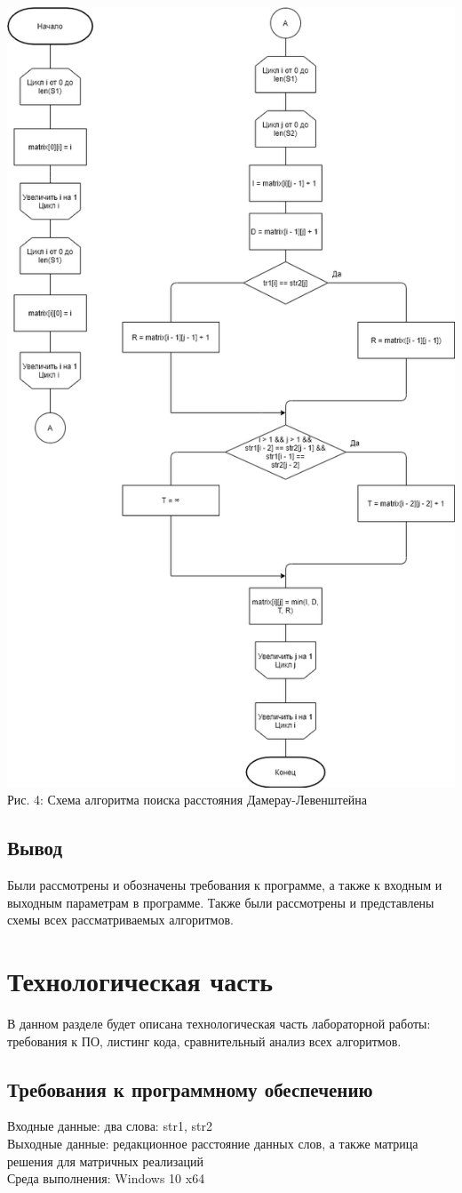 \documentclass[12pt,a4paper]{article}
\begin{document}
\begin{center}
	\includegraphics[width=.67\linewidth]{dam_lev}\\
	Рис. 4: Схема алгоритма поиска расстояния Дамерау-Левенштейна
\end{center}
\subsection{Вывод}
\qquad Были рассмотрены и обозначены требования к программе, а также к входным и выходным параметрам в программе. Также были рассмотрены и представлены схемы всех рассматриваемых алгоритмов.
\clearpage

\section{Технологическая часть}
В данном разделе будет описана технологическая часть лабораторной работы: требования к ПО, листинг кода, сравнительный анализ всех алгоритмов.
\subsection{Требования к программному обеспечению}
Входные данные: два слова: str1, str2\\
Выходные данные: редакционное расстояние данных слов, а также матрица решения для матричных реализаций\\
Среда выполнения: Windows 10 x64
\end{document}
